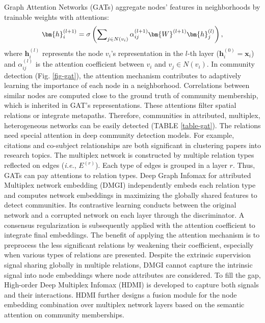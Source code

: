 \label{sec-model-gat}
Graph Attention Networks (GATs)  aggregate nodes' features in neighborhoods by trainable weights with attentions:
\begin{equation}
\small
\bm{h}_{i}^{(l+1)}=\sigma\left(\sum\nolimits_{j \in N(v_i)} \alpha_{i j}^{(l+1)} \bm{W}^{(l+1)} \bm{h}_{j}^{(l)}\right),
\end{equation}
where $\bm{h}_{i}^{(l)}$ represents the node $v_i$'s representation in the $l$-th layer ($\bm{h}_{i}^{(0)} = \bm{x}_i$) and $\alpha_{i j}^{(l)}$ is the attention coefficient between $v_i$ and $v_j \in N(v_i)$. In community detection (Fig. \ref{fig-gat}), the attention mechanism contributes to adaptively learning the importance of each node in a neighborhood. Correlations between similar nodes are computed close to the ground truth of community membership, which is inherited in GAT's representations. These attentions filter spatial relations or integrate metapaths. Therefore, communities in attributed, multiplex, heterogeneous networks can be easily detected (TABLE \ref{table-gat}).
The relations need special attention in deep community detection models. For example, citations and co-subject relationships are both significant in clustering papers into research topics. The multiplex network is constructed by multiple relation types reflected on edges (\textit{i.e.}, $E^{(r)}$). Each type of edges is grouped in a layer $r$. Thus, GATs can pay attentions to relation types. Deep Graph Infomax for attributed Multiplex network embedding (DMGI)  independently embeds each relation type and computes network embeddings in maximizing the globally shared features to detect communities. Its contrastive learning conducts between the original network and a corrupted network on each layer through the discriminator. A consensus regularization is subsequently applied with the attention coefficient to integrate final embeddings. The benefit of applying the attention mechanism is to preprocess the less significant relations by weakening their coefficient, especially when various types of relations are presented.
Despite the extrinsic supervision signal sharing globally in multiple relations, DMGI cannot capture the intrinsic signal into node embeddings where node attributes are considered. To fill the gap, High-order Deep Multiplex Infomax (HDMI)  is developed to capture both signals and their interactions. HDMI further designs a fusion module for the node embedding combination over multiplex network layers based on the semantic attention  on community memberships. 
